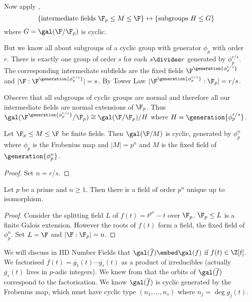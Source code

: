\documentclass[a4paper]{article}
\newcommand*{\red}[1]{\overline{#1}}
\begin{document}
Now apply ,
\[
  \{\text{intermediate fields } \F_p \leq M \leq \F\} \leftrightarrow \{\text{subgroups } H \leq G \}
\]
where \(G = \gal(\F/\F_p)\) is cyclic.

But we know all about subgroups of a cyclic group with generator \(\phi_p\) with order \(r\). There is exactly one group of order \(s\) for each \(s \divides r\) generated by \(\phi_p^{r/s}\). The corresponding intermediate subfields are the fixed fields \(\F^{\generation{\phi_p^{r/s}}}\) and \(|\F:\F^{\generation{\phi_p^{r/s}}}| = s\). By Tower Law \(|\F^{\generation{\phi_p^{r/s}}}:\F_p| = r/s\).

Observe that all subgroups of cyclic groups are normal and therefore all our intermediate fields are normal extensions of \(\F_p\). Thus \(\gal(\F^{\generation{\phi_p^{r/s}}}/\F_p) \cong \gal(\F/\F_p)/H\) where \(H = \generation{\phi_p^{r/s}}\).

\begin{corollary}
  \label{cor:galois group of finite fields}
  Let \(\F_p \leq M \leq \F\) be finite fields. Then \(\gal(\F/M)\) is cyclic, generated by \(\phi_p^n\) where \(\phi_p\) is the Frobenius map and \(|M| = p^n\) and \(M\) is the fixed field of \(\generation{\phi_p^n}\).
\end{corollary}

\begin{proof}
  Set \(n = r/s\).
\end{proof}

\begin{theorem}
  Let \(p\) be a prime and \(n \geq 1\). Then there is a field of order \(p^n\) unique up to isomorphism.
\end{theorem}

\begin{proof}
  Consider the splitting field \(L\) of \(f(t) = t^{p^n} - t\) over \(\F_p\). \(\F_p \leq L\) is a finite Galois extension. However the roots of \(f(t)\) form a field, the fixed field of \(\phi_p^n\). Set \(L = \F\) and \(|\F:\F_p| = n\).
\end{proof}

\begin{remark}
  \label{rmk:mod p reduction}
  We will discuss in IID Number Fields that \(\gal(\red f) \embed \gal(f)\) if \(f(t) \in \Z[t]\). We factorised \(\red f(t) = \red{g_1}(t)\cdots \red{g_s}(t)\) as a product of irreducibles (actually \(\red{g_s}(t)\) lives in \(p\)-adic integers). We knew from  that the orbits of \(\gal(\red f)\) correspond to the factorisation. We know \(\gal(\red f)\) is cyclic generated by the Frobenius map, which must have cyclic type \((n_1, \dots, n_s)\) where \(n_j = \deg \red{g_j}(t)\).
\end{remark}
\end{document}
